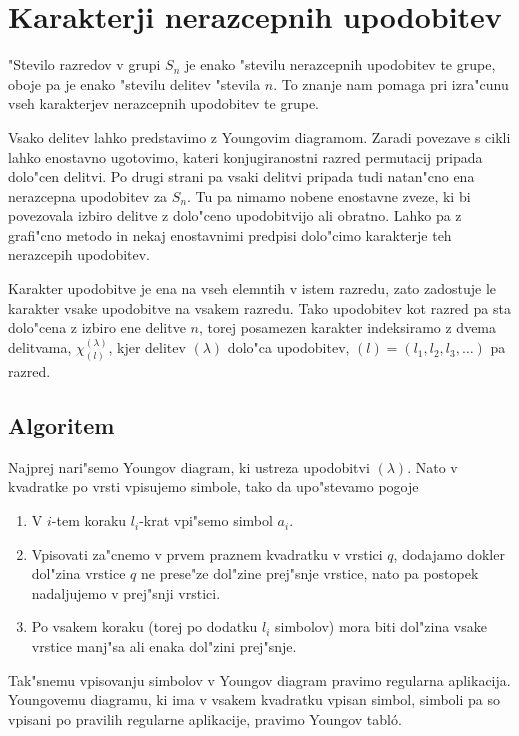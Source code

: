 \documentclass[a4paper,10pt]{article}
\begin{document}
\section{Karakterji nerazcepnih upodobitev}

"Stevilo razredov v grupi $S_n$ je enako "stevilu nerazcepnih upodobitev te grupe, oboje pa je enako "stevilu delitev "stevila $n$. To znanje nam pomaga pri izra"cunu vseh karakterjev nerazcepnih upodobitev te grupe. 

Vsako delitev lahko predstavimo z Youngovim diagramom. Zaradi povezave s cikli lahko enostavno ugotovimo, kateri konjugiranostni razred permutacij pripada dolo"cen delitvi. Po drugi strani pa vsaki delitvi pripada tudi natan"cno ena nerazcepna upodobitev za $S_n$. Tu pa nimamo nobene enostavne zveze, ki bi povezovala izbiro delitve z dolo"ceno upodobitvijo ali obratno. Lahko pa z grafi"cno metodo in nekaj enostavnimi predpisi dolo"cimo karakterje teh nerazcepih upodobitev. 

Karakter upodobitve je ena na vseh elemntih v istem razredu, zato zadostuje le karakter vsake upodobitve na vsakem razredu. Tako upodobitev kot razred pa sta dolo"cena z izbiro ene delitve $n$, torej posamezen karakter indeksiramo z dvema delitvama, $\chi^{(\lambda)}_{(l)}$, kjer delitev $(\lambda)$ dolo"ca upodobitev, $(l) = (l_1, l_2, l_3, \ldots)$ pa razred. 

\subsection{Algoritem}

Najprej nari"semo Youngov diagram, ki ustreza upodobitvi $(\lambda)$. Nato v kvadratke po vrsti vpisujemo simbole, tako da upo"stevamo pogoje

\begin{enumerate}
 \item V $i$-tem koraku $l_i$-krat vpi"semo simbol $a_i$.
 \item Vpisovati za"cnemo v prvem praznem kvadratku v vrstici $q$, dodajamo dokler dol"zina vrstice $q$ ne prese"ze dol"zine prej"snje vrstice, nato pa postopek nadaljujemo v prej"snji vrstici.
 \item Po vsakem koraku (torej po dodatku $l_i$ simbolov) mora biti dol"zina vsake vrstice manj"sa ali enaka dol"zini prej"snje. 
\end{enumerate}
 
 Tak"snemu vpisovanju simbolov v Youngov diagram pravimo regularna aplikacija. Youngovemu diagramu, ki ima v vsakem kvadratku vpisan simbol, simboli pa so vpisani po pravilih regularne aplikacije, pravimo Youngov tabl\'o. 
\end{document}
